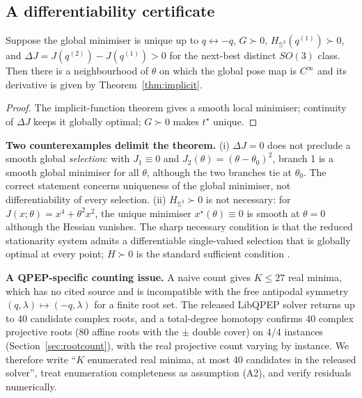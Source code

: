 \subsection{A differentiability certificate}\label{sec:cert}

\begin{theorem}\label{thm:cert}
Suppose the global minimiser is unique up to $q\leftrightarrow-q$, $G\succ0$, $H_{\mathbb{S}^3}(q^{(1)})\succ0$, and $\Delta J=J(q^{(2)})-J(q^{(1)})>0$ for the next-best distinct $SO(3)$ class. Then there is a neighbourhood of $\theta$ on which the global pose map is $C^\infty$ and its derivative is given by Theorem~\ref{thm:implicit}.
\end{theorem}

\begin{proof}
The implicit-function theorem gives a smooth local minimiser; continuity of $\Delta J$ keeps it globally optimal; $G\succ0$ makes $t^\star$ unique.
\end{proof}

\textbf{Two counterexamples delimit the theorem.}
(i) $\Delta J=0$ does not preclude a smooth global \emph{selection}: with $J_1\equiv0$ and $J_2(\theta)=(\theta-\theta_0)^2$, branch 1 is a smooth global minimiser for all $\theta$, although the two branches tie at $\theta_0$. The correct statement concerns uniqueness of the global minimiser, not differentiability of every selection.
(ii) $H_{\mathbb{S}^3}\succ0$ is not necessary: for $J(x;\theta)=x^4+\theta^2x^2$, the unique minimiser $x^\star(\theta)\equiv0$ is smooth at $\theta=0$ although the Hessian vanishes. The sharp necessary condition is that the reduced stationarity system admits a differentiable single-valued selection that is globally optimal at every point; $H\succ0$ is the standard sufficient condition \cite{dontchev2009}.

\textbf{A QPEP-specific counting issue.} A naive count gives $K\le27$ real minima, which has no cited source and is incompatible with the free antipodal symmetry $(q,\lambda)\mapsto(-q,\lambda)$ for a finite root set. The released LibQPEP solver returns up to 40 candidate complex roots, and a total-degree homotopy confirms 40 complex projective roots (80 affine roots with the $\pm$ double cover) on $4/4$ instances (Section~\ref{sec:rootcount}), with the real projective count varying by instance. We therefore write ``$K$ enumerated real minima, at most 40 candidates in the released solver'', treat enumeration completeness as assumption (A2), and verify residuals numerically.

